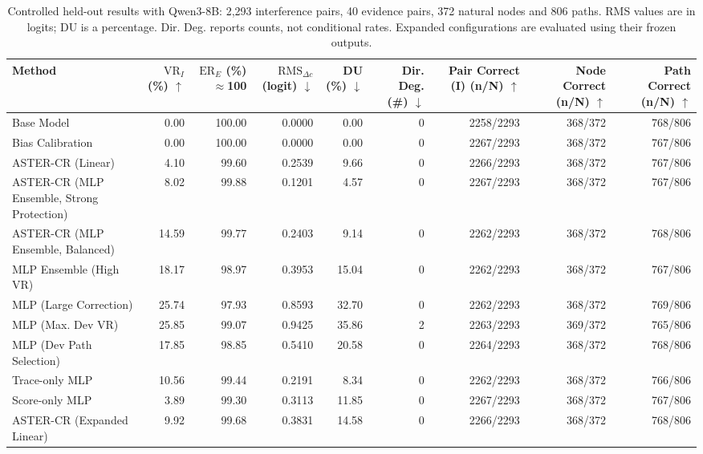 
\begin{table}[t]
\centering
\small
\setlength{\tabcolsep}{3pt}
\begin{tabularx}{\textwidth}{@{}>{\raggedright\arraybackslash}Xrrrrrrrr@{}}
\toprule
Method & \shortstack{$\mathrm{VR}_{I}$\\ (\%) $\uparrow$} & \shortstack{$\mathrm{ER}_{E}$\\ (\%) $\approx$100} & \shortstack{$\mathrm{RMS}_{\Delta c}$\\ (logit) $\downarrow$} & \shortstack{DU\\ (\%) $\downarrow$} & \shortstack{Dir. Deg.\\ (\#) $\downarrow$} & \shortstack{Pair Correct\\ (I) (n/N) $\uparrow$} & \shortstack{Node Correct\\ (n/N) $\uparrow$} & \shortstack{Path Correct\\ (n/N) $\uparrow$} \\
\midrule
Base Model & 0.00 & 100.00 & 0.0000 & 0.00 & 0 & 2258/2293 & 368/372 & 768/806 \\
Bias Calibration & 0.00 & 100.00 & 0.0000 & 0.00 & 0 & 2267/2293 & 368/372 & 767/806 \\
ASTER-CR (Linear) & 4.10 & 99.60 & 0.2539 & 9.66 & 0 & 2266/2293 & 368/372 & 767/806 \\
ASTER-CR (MLP Ensemble, Strong Protection) & 8.02 & 99.88 & 0.1201 & 4.57 & 0 & 2267/2293 & 368/372 & 767/806 \\
ASTER-CR (MLP Ensemble, Balanced) & 14.59 & 99.77 & 0.2403 & 9.14 & 0 & 2262/2293 & 368/372 & 768/806 \\
MLP Ensemble (High VR) & 18.17 & 98.97 & 0.3953 & 15.04 & 0 & 2262/2293 & 368/372 & 767/806 \\
MLP (Large Correction) & 25.74 & 97.93 & 0.8593 & 32.70 & 0 & 2262/2293 & 368/372 & 769/806 \\
MLP (Max. Dev VR) & 25.85 & 99.07 & 0.9425 & 35.86 & 2 & 2263/2293 & 369/372 & 765/806 \\
MLP (Dev Path Selection) & 17.85 & 98.85 & 0.5410 & 20.58 & 0 & 2264/2293 & 368/372 & 768/806 \\
Trace-only MLP & 10.56 & 99.44 & 0.2191 & 8.34 & 0 & 2262/2293 & 368/372 & 766/806 \\
Score-only MLP & 3.89 & 99.30 & 0.3113 & 11.85 & 0 & 2267/2293 & 368/372 & 767/806 \\
ASTER-CR (Expanded Linear) & 9.92 & 99.68 & 0.3831 & 14.58 & 0 & 2266/2293 & 368/372 & 768/806 \\
\bottomrule
\end{tabularx}
\caption{Controlled held-out results with Qwen3-8B: 2,293 interference pairs, 40 evidence pairs, 372 natural nodes and 806 paths. RMS values are in logits; DU is a percentage. Dir. Deg. reports counts, not conditional rates. Expanded configurations are evaluated using their frozen outputs.}
\label{tab:aster-main-03}
\end{table}

